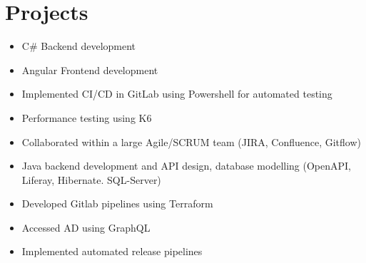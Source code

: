 \section{Projects}

\begin{itemize}
\item C\# Backend development
\item Angular Frontend development
\item Implemented CI/CD in GitLab using Powershell for automated testing
\item Performance testing using K6
\end{itemize}
\dottedline
\par
\vspace*{0.8em}
\begin{itemize}
\item Collaborated within a large Agile/SCRUM team (JIRA, Confluence, Gitflow)
\item Java backend development and API design, database modelling (OpenAPI, Liferay, Hibernate. SQL-Server)
\end{itemize}
\dottedline
\par
\vspace*{0.8em}
\begin{itemize}
\item Developed Gitlab pipelines using Terraform
\item Accessed AD using GraphQL
\item Implemented automated release pipelines
\end{itemize}
